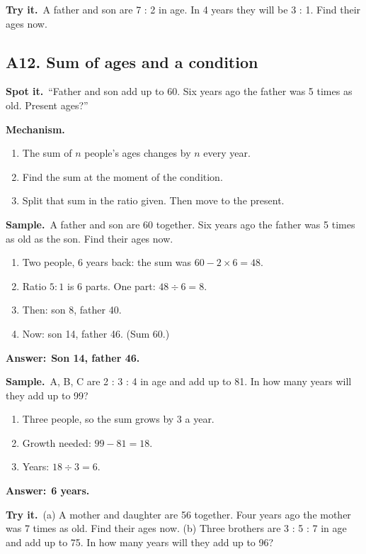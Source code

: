 \documentclass[11pt,a4paper]{article}
\let\oldsubsection\subsection
\renewcommand{\subsection}{\needspace{9\baselineskip}\oldsubsection}
\newcommand{\spot}{\textbf{\color{ember}Spot it.}\ }
\newcommand{\mech}{\textbf{\color{ember}Mechanism.}\ }
\newif\ifkeepsamp
\newcommand{\ans}[1]{\par\nopagebreak\noindent\textbf{\color{ember}Answer:}\ \textbf{#1}\par}
\newcommand{\samp}{\ifkeepsamp\needspace{4\baselineskip}\fi\textbf{\color{ember}Sample.}\ }
\newcommand{\tryit}[1]{\textbf{\color{ember}Try it.}\ #1}
\begin{document}
\tryit A father and son are 7 : 2 in age. In 4 years they will be 3 : 1. Find their ages now.

\subsection{A12. Sum of ages and a condition}
\spot ``Father and son add up to 60. Six years ago the father was 5 times as old. Present ages?''

\mech
\begin{enumerate}
\item The sum of $n$ people's ages changes by $n$ every year.
\item Find the sum at the moment of the condition.
\item Split that sum in the ratio given. Then move to the present.
\end{enumerate}

\samp A father and son are 60 together. Six years ago the father was 5 times as old as the son. Find their ages now.
\begin{enumerate}
\item Two people, 6 years back: the sum was $60 - 2 \times 6 = 48$.
\item Ratio $5 : 1$ is 6 parts. One part: $48 \div 6 = 8$.
\item Then: son 8, father 40.
\item Now: son 14, father 46. (Sum 60.)
\end{enumerate}
\ans{Son 14, father 46.}

\samp A, B, C are 2 : 3 : 4 in age and add up to 81. In how many years will they add up to 99?
\begin{enumerate}
\item Three people, so the sum grows by 3 a year.
\item Growth needed: $99 - 81 = 18$.
\item Years: $18 \div 3 = 6$.
\end{enumerate}
\ans{6 years.}

\tryit (a) A mother and daughter are 56 together. Four years ago the mother was 7 times as old. Find their ages now. (b) Three brothers are 3 : 5 : 7 in age and add up to 75. In how many years will they add up to 96?
\end{document}
